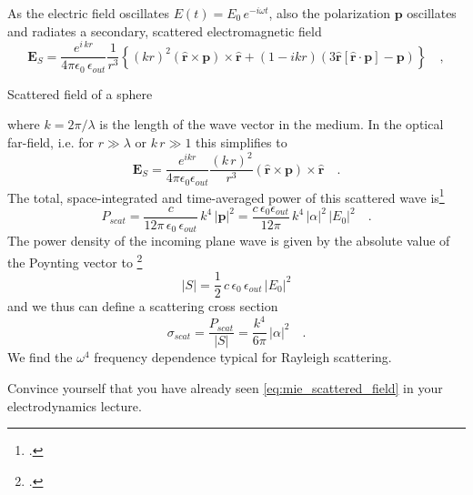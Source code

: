 As the electric field oscillates $E(t) = E_0 \, e^{-i \omega t}$, also the polarization $\mathbf{p}$ oscillates and radiates a secondary, scattered electromagnetic field 
\begin{equation}
  \mathbf{E}_S = \frac{ e^{i \, k  r} }{4\pi\epsilon_0 \, \epsilon_{out}}  \frac{1}{r^3}\left\{
      (k r )^2 \left( \hat{\mathbf{r}} \times \mathbf{p} \right) \times \hat{\mathbf{r}} +
      \left( 1 -  i k r \right)
        \left( 3\hat{\mathbf{r}} \left[\hat{\mathbf{r}} \cdot \mathbf{p}\right] - \mathbf{p} \right)
    \right\} \quad , \label{eq:mie_scattered_field}
\end{equation}
%
\begin{marginfigure}
  \caption{Scattered field of  a sphere}
\end{marginfigure}
%
where $k = 2 \pi / \lambda$ is the length of the wave vector in the medium. In the optical far-field, i.e. for $r \gg \lambda$ or $k \, r \gg 1$ this simplifies to 
\begin{equation}
  \mathbf{E}_S = \frac{e^{ikr}}{4\pi\epsilon_0 \epsilon_{out} } 
      \frac{( k \, r)^2}{ r^3} \left( \hat{\mathbf{r}} \times \mathbf{p} \right) \times \hat{\mathbf{r}}  \quad .
\end{equation}
The total, space-integrated and time-averaged power of this scattered wave is\footcite[chapter 4.5.2]{Nolting-ED}
\begin{equation}
P_{scat} =\frac{c  }{12 \pi  \, \epsilon_0 \, \epsilon_{out} } \, k^4 \, |\mathbf{p}|^2 =
\frac{c \, \epsilon_0 \epsilon_{out} }{12 \pi  } \, k^4 \, |\alpha|^2 \, |E_0|^2 \quad .
\end{equation}
The power density of the incoming plane wave is given by the absolute value of the Poynting vector to \footcite[chapter 4.3.8]{Nolting-ED}
\begin{equation}
 |S| = \frac{1}{2} \, c \, \epsilon_0 \, \epsilon_{out} \, |E_0|^2
\end{equation}
and we thus can define a scattering cross section
\begin{equation}
\sigma_{scat} = \frac{P_{scat}}{|S|} = \frac{k^4}{6 \pi }  \, |\alpha|^2  \quad .
\end{equation}
We find the $\omega^4$ frequency dependence typical for Rayleigh scattering.


\begin{questions}
  \item Convince yourself that you have already seen \ref{eq:mie_scattered_field} in your electrodynamics lecture.
\end{questions}

